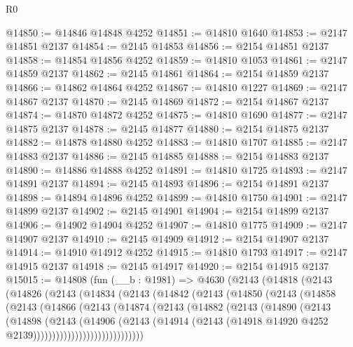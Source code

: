 \begin{lexlean}{R0}
\begin{coremodule}
@14850 := @14846 @14848 @4252
@14851 := @14810 @1640
@14853 := @2147 @14851 @2137
@14854 := @2145 @14853
@14856 := @2154 @14851 @2137
@14858 := @14854 @14856 @4252
@14859 := @14810 @1053
@14861 := @2147 @14859 @2137
@14862 := @2145 @14861
@14864 := @2154 @14859 @2137
@14866 := @14862 @14864 @4252
@14867 := @14810 @1227
@14869 := @2147 @14867 @2137
@14870 := @2145 @14869
@14872 := @2154 @14867 @2137
@14874 := @14870 @14872 @4252
@14875 := @14810 @1690
@14877 := @2147 @14875 @2137
@14878 := @2145 @14877
@14880 := @2154 @14875 @2137
@14882 := @14878 @14880 @4252
@14883 := @14810 @1707
@14885 := @2147 @14883 @2137
@14886 := @2145 @14885
@14888 := @2154 @14883 @2137
@14890 := @14886 @14888 @4252
@14891 := @14810 @1725
@14893 := @2147 @14891 @2137
@14894 := @2145 @14893
@14896 := @2154 @14891 @2137
@14898 := @14894 @14896 @4252
@14899 := @14810 @1750
@14901 := @2147 @14899 @2137
@14902 := @2145 @14901
@14904 := @2154 @14899 @2137
@14906 := @14902 @14904 @4252
@14907 := @14810 @1775
@14909 := @2147 @14907 @2137
@14910 := @2145 @14909
@14912 := @2154 @14907 @2137
@14914 := @14910 @14912 @4252
@14915 := @14810 @1793
@14917 := @2147 @14915 @2137
@14918 := @2145 @14917
@14920 := @2154 @14915 @2137
@15015 := @14808
    (fun (__b : @1981) =>
    @4630
      (@2143
        (@14818
          (@2143
            (@14826
              (@2143
                (@14834
                  (@2143
                    (@14842
                      (@2143
                        (@14850
                          (@2143
                            (@14858
                              (@2143
                                (@14866
                                  (@2143
                                    (@14874
                                      (@2143
                                        (@14882
                                          (@2143
                                            (@14890
                                              (@2143
                                                (@14898
                                                  (@2143
                                                    (@14906
                                                      (@2143
                                                        (@14914
                                                          (@2143
                                                            (@14918
                                                              @14920
                                                              @4252
                                                              @2139)))))))))))))))))))))))))))))

\end{coremodule}
\end{lexlean}
